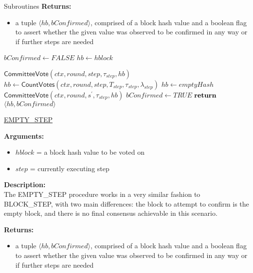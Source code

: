 \documentclass[10pt,a4paper]{article}
\begin{document}
\begin{section}{Subroutines}
\noindent \textbf{Returns:}
\begin{itemize}
    \item a tuple $\langle hb, bConfirmed \rangle$, comprised of a block hash value and a 
    boolean flag to assert whether the given value was
    observed to be confirmed in any way or if further steps are needed
  \end{itemize}


\begin{algorithm}[H]
    \begin{algorithmic}[H]
        \State $bConfirmed \gets FALSE$
        \State $hb \gets hblock$

    \State $\mathsf{CommitteeVote}(ctx, round, step, \tau_{step}, hb)$
    \State $hb \gets \mathsf{CountVotes}(ctx,round,step,T_{step},\tau_{step},\lambda_{step})$
        \State $hb \gets emptyHash$
            \State $\mathsf{CommitteeVote}(ctx, round, s^\prime, \tau_{step}, hb)$
        \EndFor
        \State $bConfirmed \gets TRUE$
    \EndIf
    $\Return$ $\langle hb, bConfirmed \rangle$
    \EndFunction
    \end{algorithmic}
    \caption{\underline{EMPTY\_STEP}}
\end{algorithm}

\noindent \textbf{Arguments:}
\begin{itemize}
    \item $hblock$ = a block hash value to be voted on
    \item $step$ = currently executing step
  \end{itemize}

\noindent \textbf{Description:}\\
The EMPTY\_STEP procedure works in a very similar fashion to BLOCK\_STEP, 
with two main differences: 
the block to attempt to confirm is the empty block, and there is no final 
consensus achievable in this scenario.

\noindent \textbf{Returns:}
\begin{itemize}
    \item a tuple $\langle hb, bConfirmed \rangle$, comprised of a block hash 
    value and a boolean flag to assert whether the given value was
    observed to be confirmed in any way or if further steps are needed
  \end{itemize}


\end{section}
\end{document}
